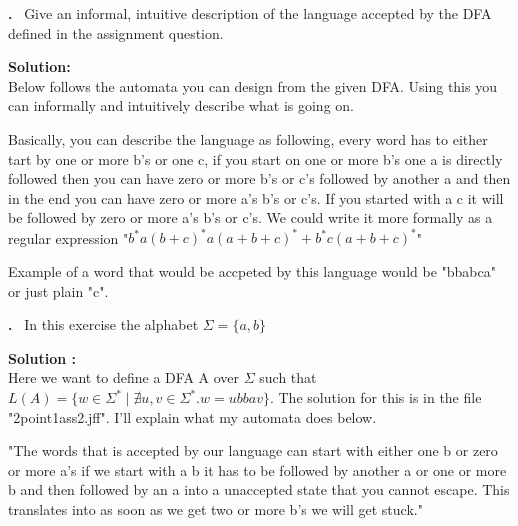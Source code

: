 \documentclass{article}
\newcounter{problem}
\newcounter{solution}
\newcommand\Problem{%
  \stepcounter{problem}%
  \textbf{\theproblem.}~%
  \setcounter{solution}{0}%
}
\newcommand\TheSolution{%
  \textbf{Solution:}\\%
}
\newcommand\ASolution{%
  \stepcounter{solution}%
  \textbf{Solution \thesolution:}\\%
}
\begin{document}
\begin{center}
\end{center}

\Problem Give an informal, intuitive description of the language accepted by the DFA defined in the assignment question.

\TheSolution Below follows the automata you can design from the given DFA. Using this you can informally and intuitively describe what is going on. 

\begin{center}
\end{center}

Basically, you can describe the language as following, every word has to either
tart by one or more b's or one c, if you start on one or more b's one a is 
directly followed then you can have zero or more b's or c's followed by another
a and then in the end you can have zero or more a's b's or c's. If you started 
with a c it will be followed by zero or more a's b's or c's. We could write it more 
formally as a regular expression "$b^*a(b+c)^*a(a+b+c)^* + b^*c(a+b+c)^*$"

Example of a word that would be accpeted by this language would be "bbabca" or just 
plain "c".

\newpage
\Problem In this exercise the alphabet $\Sigma = \{a,b\}$

\ASolution Here we want to define a DFA A over $\Sigma$ such that $L(A) = \{w \in \Sigma^* \mid \nexists u,v \in \Sigma^*. w = ubbav \}$. The solution for this is in the file "2point1ass2.jff". I'll explain what my automata does below.

\begin{center}
    "The words that is accepted by our language can start with 
    either one b or zero or more a's if we start with a b it 
    has to be followed by another a or one or more b and then 
    followed by an a into a unaccepted state that you cannot 
    escape. This translates into as soon as we get two or more 
    b's we will get stuck."
\end{center}
\end{document}
